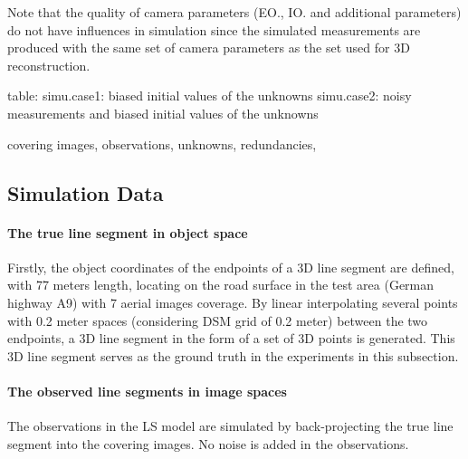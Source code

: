 Note that the quality of camera parameters (EO., IO. and additional parameters) do not have influences in simulation since the simulated measurements are produced with the same set of camera parameters as the set used for 3D reconstruction.

table:
simu.case1: biased initial values of the unknowns
simu.case2: noisy measurements and biased initial values of the unknowns

covering images, observations, unknowns, redundancies, 




\subsection{Simulation Data}
\label{subsec:simudata}

\paragraph{The true line segment in object space}
Firstly, the object coordinates of the endpoints of a 3D line segment are defined, with 77 meters length, locating on the road surface in the test area (German highway A9) with 7 aerial images coverage. By linear interpolating several points with 0.2 meter spaces (considering DSM grid of 0.2 meter) between the two endpoints, a 3D line segment in the form of a set of 3D points is generated.
This 3D line segment serves as the ground truth in the experiments in this subsection. 

\paragraph{The observed line segments in image spaces}
The observations in the LS model are simulated by back-projecting the true line segment into the covering images. No noise is added in the observations.

